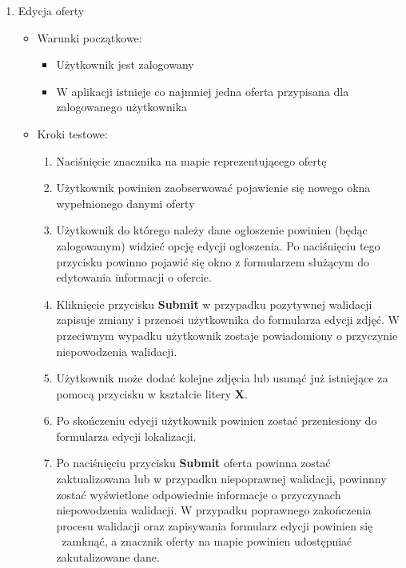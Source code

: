 \begin{enumerate}
 \item Edycja oferty
  \begin{itemize}
   \item Warunki początkowe:
    \begin{itemize}
     \item Użytkownik jest zalogowany
     \item W aplikacji istnieje co najmniej jedna oferta przypisana dla zalogowanego użytkownika
    \end{itemize}
   \item Kroki testowe:
    \begin{enumerate}
     \item Naciśnięcie znacznika na mapie reprezentującego ofertę
     \item Użytkownik powinien zaobserwować pojawienie się nowego okna wypełnionego danymi oferty
     \item Użytkownik do którego należy dane ogłoszenie powinien (będąc zalogowanym) widzieć opcję edycji ogłoszenia. Po naciśnięciu tego przycisku powinno pojawić się okno z formularzem służącym do edytowania informacji o ofercie.
     \item Kliknięcie przycisku \textbf{Submit} w przypadku pozytywnej walidacji zapisuje zmiany i przenosi użytkownika do formularza edycji zdjęć. W przeciwnym wypadku użytkownik zostaje powiadomiony o przyczynie niepowodzenia walidacji.
     \item Użytkownik może dodać kolejne zdjęcia lub usunąć już istniejące za pomocą przycisku w kształcie litery \textbf{X}.
     \item Po skończeniu edycji użytkownik powinien zostać przeniesiony do formularza edycji lokalizacji.
     \item Po naciśnięciu przycisku \textbf{Submit} oferta powinna zostać zaktualizowana lub w przypadku niepoprawnej walidacji, powinnny zostać wyświetlone odpowiednie informacje o przyczynach niepowodzenia walidacji. W przypadku poprawnego zakończenia procesu walidacji oraz zapisywania formularz edycji powinien się  zamknąć, a znacznik oferty na mapie powinien udostępniać zakutalizowane dane.
    \end{enumerate}
  \end{itemize} 


\end{enumerate}
